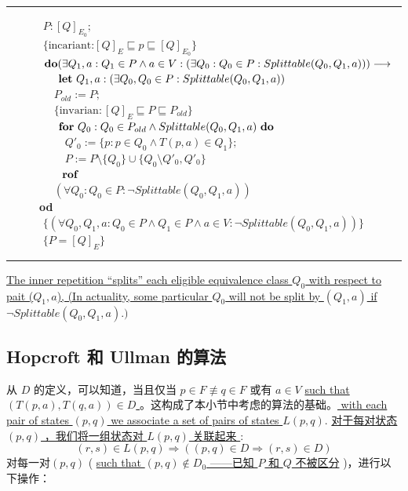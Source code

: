 \\
\rule{\textwidth}{1pt}
\mbox{　　　} $P:[Q]_{E_0};$ \\
\mbox{　　　} $\{ \mbox{incariant:} [Q]_E \sqsubseteq p \sqsubseteq [Q]_{E_0} \}$ \\
\mbox{　　　} $\mbox{\textbf{do}} ( \exists Q_1,a : Q_1 \in P \land a \in V : ( \exists Q_0 : Q_0 \in P : Splittable ( Q_0 , Q_1, a ) ) ) \longrightarrow $ \\
\mbox{　　　　} $ \mbox{ \textbf{let} } Q_1 ,a : ( \exists Q_0,Q_0 \in P : Splittable (Q_0,Q_1,a))  $ \\
\mbox{　　　　} $ P_{old} := P ; $ \\
\mbox{　　　　} $ \{ \mbox{invarian} : [Q]_E \sqsubseteq P \sqsubseteq P_{old}  \} $ \\
\mbox{　　　　} $ \mbox{ \textbf{for} }  Q_0: Q_0 \in P_{old} \land Splittable (Q_0, Q_1, a) \mbox{ \textbf{do} } $ \\
\mbox{　　　　　} $ Q'_0 := \{  p:p \in Q_0 \land T(p,a) \in Q_1 \} ; $ \\
\mbox{　　　　　} $ P:= P \setminus \{  Q_0 \} \cup \{ Q_0 \setminus Q'_0,Q'_0   \} $ \\
\mbox{　　　　} $ \mbox{  \textbf{ rof }} $ \\
\mbox{　　　　} $ (\forall Q_0:Q_0 \in P : \neg Splittable ( Q_0,Q_1,a)) $ \\
\mbox{　　　\textbf{od}}\\
\mbox{　　　} $ \{ (\forall Q_0,Q_1,a : Q_0 \in P \land Q_1 \in P \land a \in V : \neg Splittable (Q_0,Q_1,a))  \} $ \\
\mbox{　　　} $\{  P = [Q]_E \}$ \\
\rule{\textwidth}{1pt}
\uline{The inner repetition “splits” each eligible equivalence class $Q_0$ with respect to pait ($Q_1,a$), (In actuality, some particular $Q_0$ will not be split by $(Q_1,a)$ if $\neg Splittable(Q_0,Q_1,a).)$}

\subsection{Hopcroft 和 Ullman 的算法 }

从 $D$ 的定义，可以知道，当且仅当 $p \in F \not\equiv q \in F$ 或有 $a\in V$ \uline{such that $(T(p,a),T(q,a)) \in D$ }。这构成了本小节中考虑的算法的基础。\uline{ with each pair of states $(p,q)$ we associate a set of pairs of states $L(p,q)$}. 
\uline{ 对于每对状态 $(p,q)$ ，我们将一组状态对 $L(p,q)$ 关联起来 }:
$$ (r,s) \in L(p,q) \Rightarrow ((p,q) \in D \Rightarrow (r,s) \in D) $$
对每一对$(p,q)$ ( \uline{such that $ (p,q) \not\in D_0 $ ——已知 $P$ 和 $Q$ 不被区分} )，进行以下操作：


